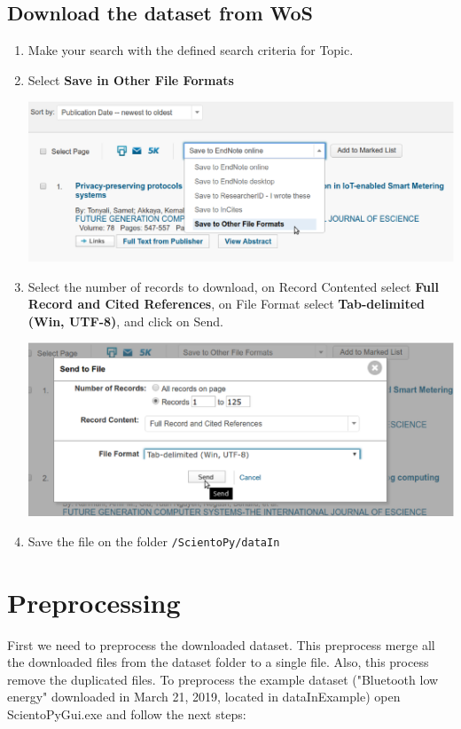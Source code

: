 \documentclass[10pt,letterpaper]{article}
\begin{document}
\subsection{Download the dataset from WoS}
\begin{enumerate}
\item Make your search with the defined search criteria for Topic. 
\item Select \textbf{Save in Other File Formats}
	\begin{center}
		\includegraphics[scale=0.33]{./figures/wos1.eps}
	\end{center}

\item Select the number of records to download, on Record Contented select \textbf{Full Record and Cited References}, on File Format select \textbf{Tab-delimited (Win, UTF-8)}, and click on Send.
	\begin{center}
		\includegraphics[scale=0.33]{./figures/wos2.eps}
	\end{center}

\item Save the file on the folder \verb|/ScientoPy/dataIn|
\end{enumerate}


\section{Preprocessing}

First we need to preprocess the downloaded dataset. This preprocess merge all the downloaded files from the dataset folder to a single file. Also, this process remove the duplicated files. To preprocess the example dataset ("Bluetooth low energy"  downloaded in March 21, 2019, located in dataInExample) open ScientoPyGui.exe and follow the next steps: 
\end{document}
